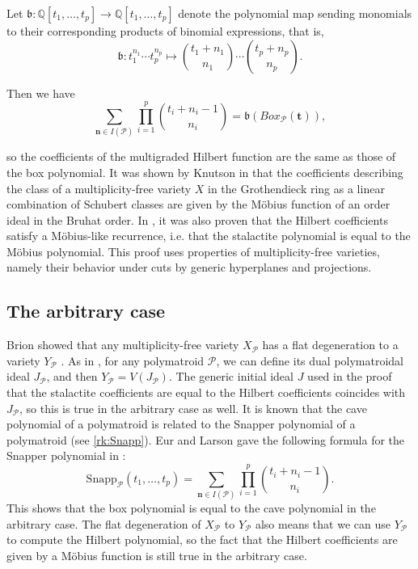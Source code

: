 \documentclass[a4paper, 11pt]{amsart}
\theoremstyle{definition}
\newcommand{\bfn}{\mathbf{n}}
\newcommand{\bft}{\mathbf{t}}
\newcommand{\sP}{\mathscr{P}}
\newcommand{\Q}{\mathbb{Q}}
\begin{document}
 Let $\mathfrak{b}\colon \Q[t_1,\ldots,t_p] \to \Q[t_1,\ldots,t_p]$ denote the polynomial map sending monomials to their corresponding products of binomial expressions, that is, $$\mathfrak{b}\colon t_1^{n_1}\cdots t_p^{n_p} \mapsto \binom{t_1+n_1}{n_1}\cdots\binom{t_p+n_p}{n_p}.$$

Then we have \[\sum_{\mathbf{n} \in I(\sP)}\prod_{i=1}^p\binom{t_i+n_i-1}{n_i}  = \mathfrak{b}(Box_{\sP}(\bft)),\]

so the coefficients of the multigraded Hilbert function are the same as those of the box polynomial.
 It was shown by Knutson in \cite[Theorem 3]{Knutson} that the coefficients describing the class of a multiplicity-free variety $X$ in the Grothendieck ring as a linear combination of Schubert classes are given by the M\"obius function of an order ideal in the Bruhat order. In \cite[Theorem 6.12(iii)]{CCRMM}, it was also proven that the Hilbert coefficients satisfy a M\"obius-like recurrence, i.e. that the stalactite polynomial is equal to the M\"obius polynomial. This proof uses properties of multiplicity-free varieties, namely their behavior under cuts by generic hyperplanes and projections.

\subsection{The arbitrary case}\label{sec:arbitrary}

Brion showed that any multiplicity-free variety $X_\sP$ has a flat degeneration to a variety $Y_\sP$ \cite{Brion}. As in \cite[Definition 2.7]{CRMS}, for any polymatroid $\sP$, we can define its dual polymatroidal ideal $J_\sP$, and then $Y_\sP = V(J_\sP)$. The generic initial ideal $J$ used in the proof that the stalactite coefficients are equal to the Hilbert coefficients coincides with $J_\sP$, so this is true in the arbitrary case as well. It is known that the cave polynomial of a polymatroid is related to the Snapper polynomial of a polymatroid (see \autoref{rk:Snapp}). Eur and Larson gave the following formula for the Snapper polynomial in \cite[Proposition 2.8]{EL23}:
\[\mathrm{Snapp}_\sP(t_1,\ldots,t_p) = \sum_{\bfn \in I(\sP)} \prod_{i=1}^p \binom{t_i+n_i-1}{n_i}.\]
This shows that the box polynomial is equal to the cave polynomial in the arbitrary case. The flat degeneration of $X_\sP$ to $Y_\sP$ also means that we can use $Y_\sP$ to compute the Hilbert polynomial, so the fact that the Hilbert coefficients are given by a M\"obius function is still true in the arbitrary case. 
\end{document}
